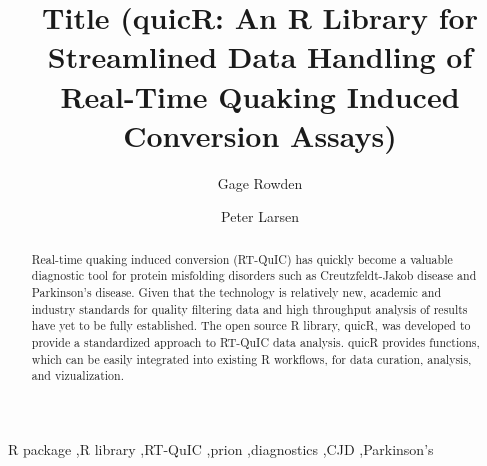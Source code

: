 \documentclass[preprint,12pt, a4paper]{elsarticle}
\begin{document}
\renewcommand{\labelenumii}{\arabic{enumi}.\arabic{enumii}}

\begin{frontmatter}

 


\title{Title (quicR: An R Library for Streamlined Data Handling of Real-Time Quaking Induced Conversion Assays)}

\author[label1,label2,label3]{Gage Rowden}
\author[label1,label2,label3]{Peter Larsen}
\address[label1]{Department of Veterinary and Biomedical Sciences, University of Minnesota, St. Paul, MN 55108, USA.}
\address[label2]{Minnesota Center for Prion Research and Outreach, University of Minnesota, St. Paul, MN 55108, USA.}
\address[label3]{Priogen Corp., St. Paul, MN 55114, USA.}

\begin{abstract}
Real-time quaking induced conversion (RT-QuIC) has quickly become a valuable diagnostic tool for protein misfolding disorders such as Creutzfeldt-Jakob disease and Parkinson's disease. Given that the technology is relatively new, academic and industry standards for quality filtering data and high throughput analysis of results have yet to be fully established. The open source R library, quicR, was developed to provide a standardized approach to RT-QuIC data analysis. quicR provides functions, which can be easily integrated into existing R workflows, for data curation, analysis, and vizualization.
\end{abstract}

\begin{keyword}
R package \sep R library \sep RT-QuIC \sep prion \sep diagnostics \sep CJD \sep Parkinson's



\end{keyword}

\end{frontmatter}
\end{document}
